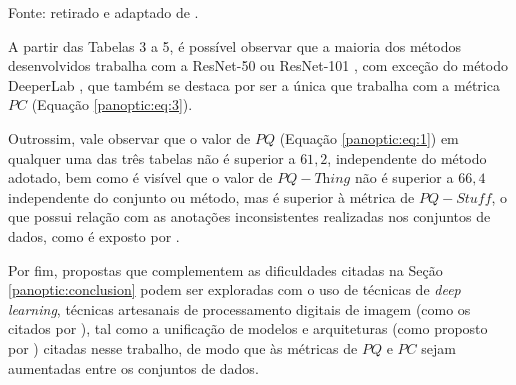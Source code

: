 \begin{table}[H]
    \centering
    \caption{Comparação de desempenho no \textit{dataset} Mapillary.}
    \label{conclusion:table:3}

    \vspace*{1 cm}
    Fonte: retirado e adaptado de \cite{Li2020Awesome-Panoptic-Segmentation}.
\end{table}

A partir das Tabelas 3 a 5, é possível observar que a maioria dos métodos desenvolvidos trabalha com a ResNet-50 ou ResNet-101 \cite{He2016}, com exceção do método DeeperLab \cite{Yang2019}, que também se destaca por ser a única que trabalha com a métrica $PC$ (Equação \ref{panoptic:eq:3}).

Outrossim, vale observar que o valor de $PQ$ (Equação \ref{panoptic:eq:1}) em qualquer uma das três tabelas não é superior a $61,2$, independente do método adotado, bem como é visível que o valor de $PQ-\textit{Thing}$ não é superior a  $66,4$ independente do conjunto ou método, mas é superior à métrica de $PQ-\textit{Stuff}$, o que possui relação com as anotações inconsistentes realizadas nos conjuntos de dados, como é exposto por \cite{Kirillov2019a}.

Por fim, propostas que complementem as dificuldades citadas na Seção \ref{panoptic:conclusion} podem ser exploradas com o uso de técnicas de \textit{deep learning}, técnicas artesanais de processamento digitais de imagem (como os citados por \cite{pedrini2008analise}), tal como a unificação de modelos e arquiteturas (como proposto por \cite{Liu2019}) citadas nesse trabalho, de modo que às métricas de $PQ$ e $PC$ sejam aumentadas entre os conjuntos de dados.